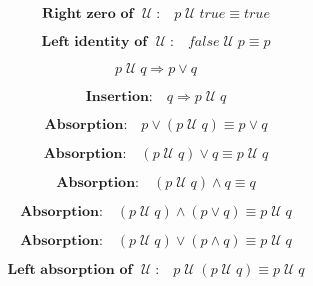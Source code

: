 \documentclass[fleqn, leqno]{article}
\newcommand{\impl}{\ensuremath{\Rightarrow}}        %
\newcommand{\Until}{\;\mathcal{U}\;}
\newcommand{\spacer}{\vspace{-30pt}}
\begin{document}
\spacer

\begin{equation}\label{E:zeroUntil}
\textbf{Right zero of $\Until$:}\quad p \Until true \equiv true
\end{equation}

\spacer

\begin{equation}\label{E:leftIdUntil}
\textbf{Left identity of $\Until$:}\quad false \Until p \equiv p
\end{equation}

\spacer

\begin{equation}\label{E:untilImpOr}
p \Until q \impl p \lor q
\end{equation}

\spacer

\begin{equation}\label{E:untilInsertion}
\textbf{Insertion:}\quad q \impl p \Until q
\end{equation}

\spacer

\begin{equation}\label{E:untilOrP}
\textbf{Absorption:}\quad p \lor (p \Until q) \equiv p \lor q
\end{equation}

\spacer

\begin{equation}\label{E:untilOrQ}
\textbf{Absorption:}\quad (p \Until q) \lor q \equiv p \Until q
\end{equation}

\spacer

\begin{equation}\label{E:untilAndQ}
\textbf{Absorption:}\quad (p \Until q) \land q \equiv q
\end{equation}

\spacer

\begin{equation}\label{E:untilAndOr}
\textbf{Absorption:}\quad (p \Until q) \land (p \lor q) \equiv p \Until q
\end{equation}

\spacer

\begin{equation}\label{E:untilOrAnd}
\textbf{Absorption:}\quad (p \Until q) \lor (p \land q) \equiv p \Until q
\end{equation}

\spacer

\begin{equation}\label{E:untilIdem}
\textbf{Left absorption of $\Until$:}\quad p \Until (p \Until q) \equiv p \Until q
\end{equation}
\end{document}
